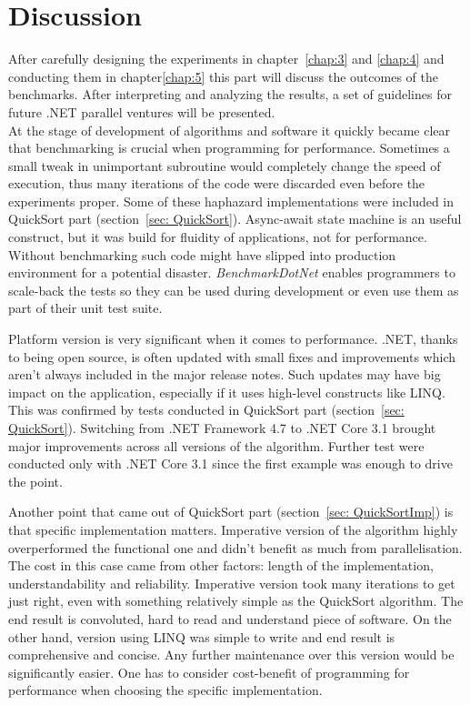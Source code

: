\chapter{Discussion}
After carefully designing the experiments in chapter~\ref{chap:3} and \ref{chap:4} and conducting them in chapter\ref{chap:5} this part will discuss the outcomes of the benchmarks. 
After interpreting and analyzing the results, a set of guidelines for future .NET parallel ventures will be presented. \\
 
At the stage of development of algorithms and software it quickly became clear that benchmarking is crucial when programming for performance. 
Sometimes a small tweak in unimportant subroutine would completely change the speed of execution, thus many iterations of the code were discarded even before the experiments proper. 
Some of these haphazard implementations were included in QuickSort part (section~\ref{sec: QuickSort}). Async-await state machine is an useful construct, but it was build for fluidity of applications, not for performance. Without benchmarking such code might have slipped into production environment for a potential disaster. \emph{BenchmarkDotNet} enables programmers
to scale-back the tests so they can be used during development or even use them as part of their unit test suite.

Platform version is very significant when it comes to performance. .NET, thanks to being open source, is often updated with small fixes and improvements which aren't always included in the major release notes. Such updates may have big impact on the application, especially if it uses high-level constructs like LINQ. This was confirmed by tests conducted in QuickSort part (section~\ref{sec: QuickSort}). Switching from .NET Framework 4.7 to .NET Core 3.1 brought major improvements across all versions of the algorithm. Further test were conducted only with .NET Core 3.1 since the first example was enough to drive the point.

Another point that came out of QuickSort part (section~\ref{sec: QuickSortImp}) is that specific implementation matters. Imperative version of the algorithm highly overperformed the functional one and didn't benefit as much from parallelisation. The cost in this case came from other factors: length of the implementation, understandability and reliability. Imperative version took many iterations to get just right, even with something relatively simple as the QuickSort algorithm. The end result is convoluted, hard to read and understand piece of software. On the other hand, version using LINQ was simple to write and end result is comprehensive and concise. Any further maintenance over this version would be significantly easier. One has to consider cost-benefit of programming for performance when choosing the specific implementation. 

